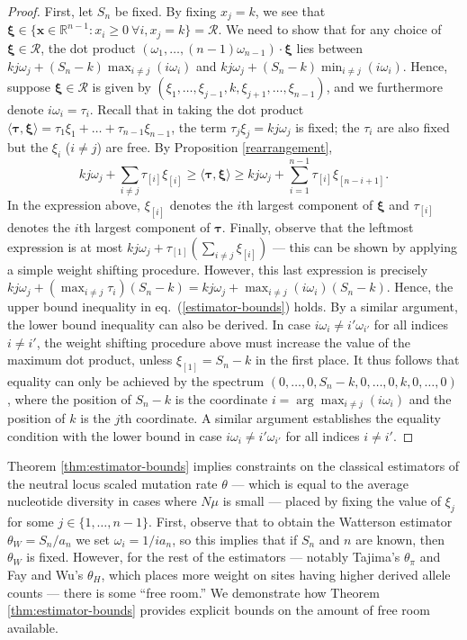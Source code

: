 \documentclass[lettersize, 10pt]{article}
\begin{document}
\begin{proof}
First, let $S_n$ be fixed. By fixing $x_j= k$, we see that $\boldsymbol{\xi}\in \{\mathbf{x}\in \mathbb{R}^{n-1}: x_i \geqslant 0~\forall i, x_j=k\}=\mathcal{R}$. We need to show that for any choice of $\boldsymbol{\xi}\in \mathcal{R}$, the dot product $(\omega_1,\ldots, (n-1)\omega_{n-1})\cdot\boldsymbol{\xi}$ lies between $kj\omega_j + (S_n-k)\max_{i\neq j}(i\omega_i)$ and $kj\omega_j + (S_n-k)\min_{i\neq j}(i\omega_i)$. Hence, suppose $\boldsymbol{\xi}\in \mathcal{R}$ is given by $(\xi_1,\ldots,\xi_{j-1},k,\xi_{j+1},\ldots,\xi_{n-1})$, and we furthermore denote $i\omega_i=\tau_i$. Recall that in taking the dot product $\langle \boldsymbol{\tau},\boldsymbol{\xi}\rangle = \tau_1\xi_1+\ldots+\tau_{n-1}\xi_{n-1}$, the term $\tau_j\xi_j = kj\omega_j$ is fixed; the $\tau_i$ are also fixed but the $\xi_i$ ($i\neq j$) are free. By Proposition \ref{rearrangement},
\begin{equation*}
kj\omega_j + \sum_{i\neq j} \tau_{[i]}\xi_{[i]} \geqslant \langle\boldsymbol{\tau},\boldsymbol{\xi}\rangle \geqslant kj\omega_j +\sum_{i=1}^{n-1} \tau_{[i]}\xi_{[n-i+1]}.
\end{equation*} 
In the expression above, $\xi_{[i]}$ denotes the $i$th largest component of $\boldsymbol{\xi}$ and $\tau_{[i]}$ denotes the $i$th largest component of $\boldsymbol{\tau}$. Finally, observe that the leftmost expression is at most $kj\omega_j + \tau_{[1]}\left(\sum_{i\neq j} \xi_{[i]}\right)$ --- this can be shown by applying a simple weight shifting procedure. However, this last expression is precisely $kj\omega_j+\left(\max_{i\neq j} \tau_i\right) (S_n-k) = kj\omega_j+\max_{i\neq j}(i\omega_i) (S_n-k)$. Hence, the upper bound inequality in eq.~(\ref{estimator-bounds}) holds. By a similar argument, the lower bound inequality can also be derived. In case $i\omega_i\neq i'\omega_{i'}$ for all indices $i\neq i'$, the weight shifting procedure above must increase the value of the maximum dot product, unless $\xi_{[1]}=S_n-k$ in the first place. It thus follows that equality can only be achieved by the spectrum $(0,\ldots,0,S_n-k,0,\ldots,0,k,0,\ldots,0)$, where the position of $S_n-k$ is the coordinate $i=\arg\max_{i\neq j}(i\omega _i)$ and the position of $k$ is the $j$th coordinate. A similar argument establishes the equality condition with the lower bound in case $i\omega_i\neq i'\omega_{i'}$ for all indices $i\neq i'$. 
\end{proof} 

Theorem \ref{thm:estimator-bounds} implies constraints on the classical estimators of the neutral locus scaled mutation rate $\theta$ --- which is equal to the average nucleotide diversity in cases where $N\mu$ is small --- placed by fixing the value of $\xi_j$ for some $j\in \{1,\ldots,n-1\}$. First, observe that to obtain the Watterson estimator $\theta_W=S_n/a_n$ we set $\omega_i=1/ia_n$, so this implies that if $S_n$ and $n$ are known, then $\theta_W$ is fixed. However, for the rest of the estimators --- notably Tajima's $\theta_\pi$ and Fay and Wu's $\theta_H$, which places more weight on sites having higher derived allele counts --- there is some ``free room.'' We demonstrate how Theorem \ref{thm:estimator-bounds} provides explicit bounds on the amount of free room available. 
  
\end{document}
